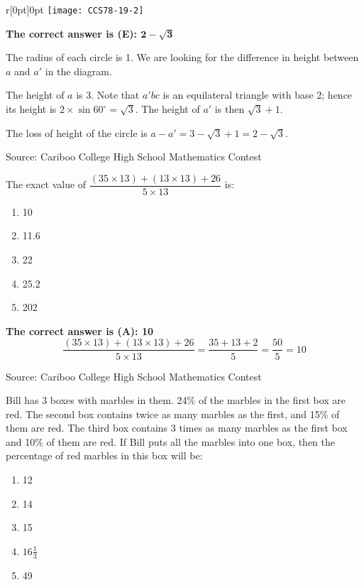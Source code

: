 \documentclass{article}
\begin{document}
\begin{wrapfigure}[8]{r}[0pt]{0pt}
	\texttt{[image: CCS78-19-2]}
\end{wrapfigure}
\textbf{The correct answer is (E): $\mathbf{2-\sqrt{3}}$}

The radius of each circle is 1. We are looking for the difference in height between $a$ and $a'$ in the diagram.

The height of $a$ is 3. Note that $a'bc$ is an equilateral triangle with base 2; hence its height is $2 \times \sin 60^{\circ} = \sqrt{3}$. The height of $a'$ is then $\sqrt{3}+1$.

The loss of height of the circle is $a-a'=3-\sqrt{3}+1=2-\sqrt{3}$. 

\vskip 1.5cm


\scriptsize
Source: Cariboo College High School Mathematics Contest

\normalsize
The exact value of $\dfrac{(35 \times 13)+(13\times13)+26}{5\times13}$ is:
\begin{enumerate}[noitemsep,topsep=0mm,leftmargin=*,widest=D,label=\Alph*)]
	\item 10
	\item 11.6
	\item 22
	\item 25.2
	\item 202
\end{enumerate}

\textbf{The correct answer is (A): 10}
\[
\frac{(35 \times 13)+(13\times13)+26}{5\times13} = \frac{35+13+2}{5} = \frac{50}{5} = 10
\]

\vskip 1.5cm


\scriptsize
Source: Cariboo College High School Mathematics Contest

\normalsize
Bill has 3 boxes with marbles in them. 24\% of the marbles in the first box are red. The second box contains twice as many marbles as the first, and 15\% of them are red. The third box contains 3 times as many marbles as the first box and 10\% of them are red. If Bill puts all the marbles into one box, then the percentage of red marbles in this box will be:
\begin{enumerate}[noitemsep,topsep=0mm,leftmargin=*,widest=D,label=\Alph*)]
	\item 12
	\item 14
	\item 15
	\item $16 \frac{1}{3}$
	\item 49
\end{enumerate}
\end{document}
